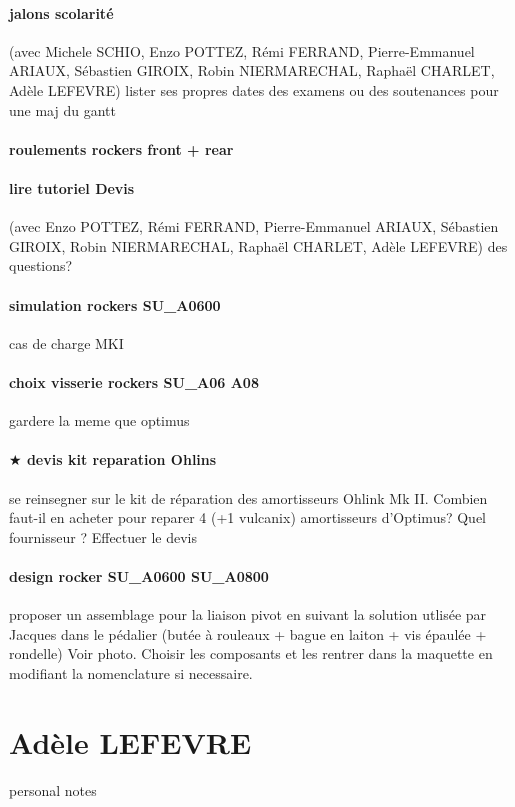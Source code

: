 \paragraph{jalons scolarité} (avec Michele SCHIO, Enzo POTTEZ, Rémi FERRAND, Pierre-Emmanuel ARIAUX, Sébastien GIROIX, Robin NIERMARECHAL, Raphaël CHARLET, Adèle LEFEVRE) lister ses propres dates des examens ou des soutenances pour une maj du gantt
\paragraph{roulements rockers front + rear} 
\paragraph{lire tutoriel Devis} (avec Enzo POTTEZ, Rémi FERRAND, Pierre-Emmanuel ARIAUX, Sébastien GIROIX, Robin NIERMARECHAL, Raphaël CHARLET, Adèle LEFEVRE) des questions?
\paragraph{simulation rockers SU\_A0600} cas de charge MKI
\paragraph{choix visserie rockers SU\_A06 A08} gardere la meme que optimus

\paragraph{$\bigstar$ devis kit reparation Ohlins} se reinsegner sur le kit de réparation des amortisseurs Ohlink Mk II. Combien faut-il en acheter pour reparer 4 (+1 vulcanix) amortisseurs d'Optimus? Quel fournisseur ? Effectuer le devis 
\paragraph{design rocker SU\_A0600 SU\_A0800} proposer un assemblage pour la liaison pivot en suivant la solution utlisée par Jacques dans le pédalier (butée à rouleaux + bague en laiton + vis épaulée + rondelle) Voir photo. Choisir les composants et les rentrer dans la maquette en modifiant la nomenclature si necessaire.

 
 \newpage \section*{Adèle LEFEVRE} 
 \par personal notes
